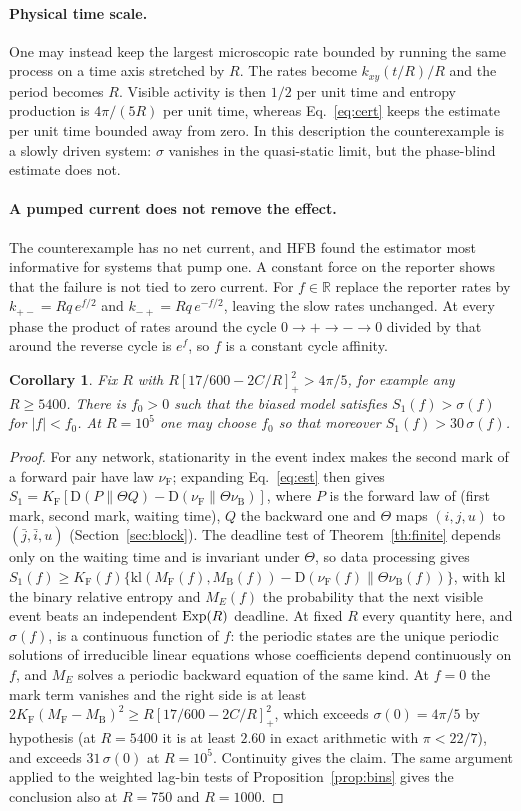 \documentclass[11pt,a4paper]{article}
\newtheorem{corollary}[theorem]{Corollary}
\newcommand{\KL}{\mathrm D}
\newcommand{\F}{\mathrm F}
\newcommand{\B}{\mathrm B}
\newcommand{\pos}[1]{\left[#1\right]_+}
\begin{document}
\paragraph{Physical time scale.} One may instead keep the largest microscopic rate bounded by running the same process on a time axis stretched by $R$. The rates become $k_{xy}(t/R)/R$ and the period becomes $R$. Visible activity is then $1/2$ per unit time and entropy production is $4\pi/(5R)$ per unit time, whereas Eq.~\eqref{eq:cert} keeps the estimate per unit time bounded away from zero. In this description the counterexample is a slowly driven system: $\sigma$ vanishes in the quasi-static limit, but the phase-blind estimate does not.

\paragraph{A pumped current does not remove the effect.} The counterexample has no net current, and HFB found the estimator most informative for systems that pump one. A constant force on the reporter shows that the failure is not tied to zero current. For $f\in\mathbb R$ replace the reporter rates by $k_{+-}=Rq\,e^{f/2}$ and $k_{-+}=Rq\,e^{-f/2}$, leaving the slow rates unchanged. At every phase the product of rates around the cycle $0\to+\to-\to0$ divided by that around the reverse cycle is $e^f$, so $f$ is a constant cycle affinity.
\begin{corollary}\label{cor:pump}
Fix $R$ with $R\pos{17/600-2C/R}^2>4\pi/5$, for example any $R\ge5400$. There is $f_0>0$ such that the biased model satisfies $S_1(f)>\sigma(f)$ for $|f|<f_0$. At $R=10^5$ one may choose $f_0$ so that moreover $S_1(f)>30\,\sigma(f)$.
\end{corollary}
\begin{proof}
For any network, stationarity in the event index makes the second mark of a forward pair have law $\nu_\F$; expanding Eq.~\eqref{eq:est} then gives $S_1=K_\F[\KL(P\|\Theta Q)-\KL(\nu_\F\|\Theta\nu_\B)]$, where $P$ is the forward law of (first mark, second mark, waiting time), $Q$ the backward one and $\Theta$ maps $(i,j,u)$ to $(\bar j,\bar i,u)$ (Section~\ref{sec:block}). The deadline test of Theorem~\ref{th:finite} depends only on the waiting time and is invariant under $\Theta$, so data processing gives $S_1(f)\ge K_\F(f)\{\mathrm{kl}(M_\F(f),M_\B(f))-\KL(\nu_\F(f)\|\Theta\nu_\B(f))\}$, with $\mathrm{kl}$ the binary relative entropy and $M_E(f)$ the probability that the next visible event beats an independent ${\rm Exp}(R)$ deadline. At fixed $R$ every quantity here, and $\sigma(f)$, is a continuous function of $f$: the periodic states are the unique periodic solutions of irreducible linear equations whose coefficients depend continuously on $f$, and $M_E$ solves a periodic backward equation of the same kind. At $f=0$ the mark term vanishes and the right side is at least $2K_\F(M_\F-M_\B)^2\ge R\pos{17/600-2C/R}^2$, which exceeds $\sigma(0)=4\pi/5$ by hypothesis (at $R=5400$ it is at least $2.60$ in exact arithmetic with $\pi<22/7$), and exceeds $31\,\sigma(0)$ at $R=10^5$. Continuity gives the claim. The same argument applied to the weighted lag-bin tests of Proposition~\ref{prop:bins} gives the conclusion also at $R=750$ and $R=1000$.
\end{proof}
\end{document}
